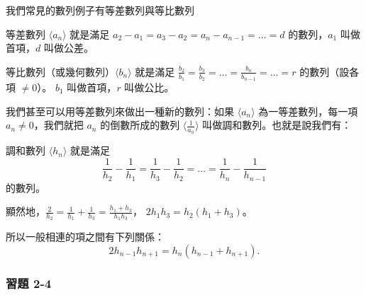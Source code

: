 我們常見的數列例子有等差數列與等比數列

\begin{definition*}
等差數列 $\langle a_n \rangle$ 就是滿足 $a_2-a_1 = a_3-a_2 = a_n-a_{n-1} = \dots = d$ 的數列，$a_1$ 叫做首項，$d$ 叫做公差。
\end{definition*}

\begin{definition*}
等比數列（或幾何數列）$\langle b_n \rangle$ 就是滿足 $\frac{b_2}{b_1} = \frac{b_3}{b_2} = \dots = \frac{b_n}{b_{n-1}} = \dots = r$ 的數列（設各項 $\ne 0$）。 $b_1$ 叫做首項，$r$ 叫做公比。
\end{definition*}

我們甚至可以用等差數列來做出一種新的數列：如果 $\langle a_n \rangle$ 為一等差數列，每一項 $a_n \ne 0$，我們就把 $a_n$ 的倒數所成的數列 $\langle \frac{1}{a_n} \rangle$ 叫做調和數列。也就是說我們有：

\begin{definition*}
調和數列 $\langle h_n \rangle$ 就是滿足
\[
\frac{1}{h_2}-\frac{1}{h_1} = \frac{1}{h_3}-\frac{1}{h_2} = \dots = \frac{1}{h_n}-\frac{1}{h_{n-1}}
\]
的數列。
\end{definition*}

顯然地，$\frac{2}{h_2} = \frac{1}{h_1}+\frac{1}{h_3} = \frac{h_1+h_3}{h_1 h_3}$， $2h_1 h_3 = h_2(h_1+h_3)$。

所以一般相連的項之間有下列關係：
\[
2h_{n-1}h_{n+1} = h_n(h_{n-1}+h_{n+1}).
\]

\subsubsection*{習題 2-4}

